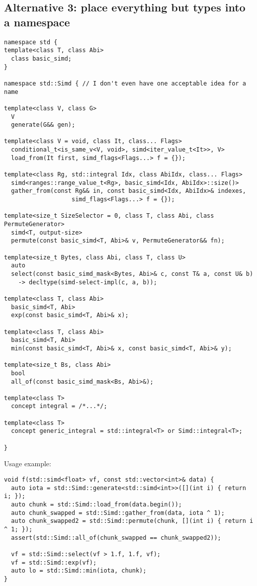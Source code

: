 \subsection{Alternative 3: place everything but types into a namespace}

\medskip\begin{lstlisting}[style=Vc]
namespace std {
template<class T, class Abi>
  class basic_simd;
}

namespace std::Simd { // I don't even have one acceptable idea for a name

template<class V, class G>
  V
  generate(G&& gen);

template<class V = void, class It, class... Flags>
  conditional_t<is_same_v<V, void>, simd<iter_value_t<It>>, V>
  load_from(It first, simd_flags<Flags...> f = {});

template<class Rg, std::integral Idx, class AbiIdx, class... Flags>
  simd<ranges::range_value_t<Rg>, basic_simd<Idx, AbiIdx>::size()>
  gather_from(const Rg&& in, const basic_simd<Idx, AbiIdx>& indexes,
                   simd_flags<Flags...> f = {});

template<size_t SizeSelector = 0, class T, class Abi, class PermuteGenerator>
  simd<T, output-size>
  permute(const basic_simd<T, Abi>& v, PermuteGenerator&& fn);

template<size_t Bytes, class Abi, class T, class U>
  auto
  select(const basic_simd_mask<Bytes, Abi>& c, const T& a, const U& b)
    -> decltype(simd-select-impl(c, a, b));

template<class T, class Abi>
  basic_simd<T, Abi>
  exp(const basic_simd<T, Abi>& x);

template<class T, class Abi>
  basic_simd<T, Abi>
  min(const basic_simd<T, Abi>& x, const basic_simd<T, Abi>& y);

template<size_t Bs, class Abi>
  bool
  all_of(const basic_simd_mask<Bs, Abi>&);

template<class T>
  concept integral = /*...*/;

template<class T>
  concept generic_integral = std::integral<T> or Simd::integral<T>;

}
\end{lstlisting}

Usage example:
\medskip\begin{lstlisting}[style=Vc]
void f(std::simd<float> vf, const std::vector<int>& data) {
  auto iota = std::Simd::generate<std::simd<int>>([](int i) { return i; });
  auto chunk = std::Simd::load_from(data.begin());
  auto chunk_swapped = std::Simd::gather_from(data, iota ^ 1);
  auto chunk_swapped2 = std::Simd::permute(chunk, [](int i) { return i ^ 1; });
  assert(std::Simd::all_of(chunk_swapped == chunk_swapped2));

  vf = std::Simd::select(vf > 1.f, 1.f, vf);
  vf = std::Simd::exp(vf);
  auto lo = std::Simd::min(iota, chunk);
}
\end{lstlisting}

